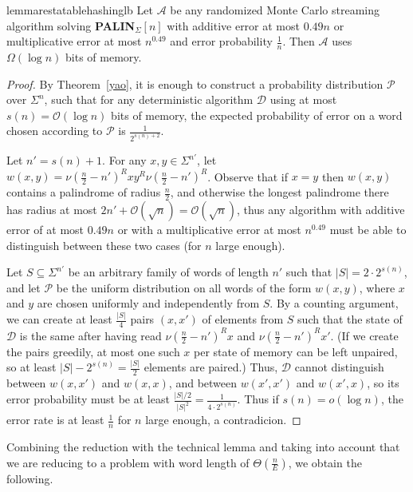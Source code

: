 \documentclass{article}[11pt,letter]
\newcommand{\bigo}{\mathcal{O}}
\newcommand{\alg}{\mathcal{A}}
\newcommand{\dalg}{\mathcal{D}}
\newcommand{\palin}[1][n]{{\bf PALIN}$_{\Sigma}[#1]$\xspace}
\begin{document}
\begin{restatable}{lemma}{restatablehashinglb}
\label{hashing_lb}
Let $\alg$ be any randomized Monte Carlo streaming algorithm solving \palin with additive error at most $0.49 n$ or multiplicative error at most
$n^{0.49}$  and error probability $\frac{1}{n}$.
Then $\alg$ uses $\Omega(\log n)$ bits of memory.
\end{restatable}


\begin{proof}
By Theorem~\ref{yao}, it is enough to construct a probability distribution $\mathcal{P}$ over $\Sigma^n$, such that for
any deterministic algorithm $\dalg$ using at most $s(n)=\bigo(\log n)$ bits of memory, the expected probability of error on a word chosen according
to $\mathcal{P}$ is $\frac{1}{2^{s(n)+2}}$.

Let $n' = s(n)+1$.  For any $x,y \in \Sigma^{n'}$, let $w(x,y) = \nu(\frac{n}{2}-n')^R x y^R \nu(\frac{n}{2}-n')^R$.
Observe that if $x=y$ then $w(x,y)$ contains a palindrome of radius $\frac{n}{2}$, and otherwise the longest palindrome there has
radius at most $2n'+\bigo(\sqrt{n}) = \bigo(\sqrt{n})$, thus any algorithm with additive error of at most $0.49  n$ or with a multiplicative error at most $n^{0.49}$
must be able to distinguish between these two cases (for $n$ large enough).

Let $S \subseteq \Sigma^{n'}$ be an arbitrary family of words of length $n'$ such that $|S| = 2 \cdot 2^{s(n)}$, and let $\mathcal{P}$ be 
the uniform distribution on all words of the form $w(x,y)$, where $x$ and $y$ are chosen uniformly and independently from $S$.
By a counting argument, we can create at least $\frac{|S|}{4}$ pairs $(x,x')$ of elements
from $S$ such that the state of $\dalg$ is the same after having read $\nu(\frac{n}{2}-n')^Rx$ and $\nu(\frac{n}{2}-n')^Rx'$. 
(If we create the pairs greedily, at most one such $x$ per state of memory can be left unpaired, so at least $|S| - 2^{s(n)} = \frac{|S|}2$ elements are paired.)
Thus, $\dalg$ cannot
distinguish between $w(x,x')$ and $w(x,x)$, and between $w(x',x')$ and $w(x',x)$, so its error probability must be at least
$\frac{|S|/2}{|S|^2} = \frac{1}{4\cdot 2^{s(n)}}$. Thus if $s(n) = o(\log n)$, the error rate is at least $\frac{1}{n}$ for $n$ large enough, a contradicion.
\end{proof}

Combining the reduction with the technical lemma and 
taking into account that we are reducing to a problem with word length of $\Theta(\frac{n}{E})$,
we obtain the following.
\end{document}
